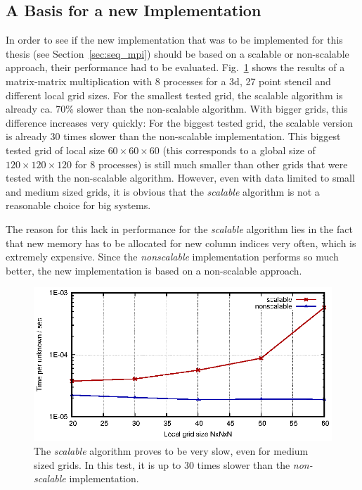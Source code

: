 \subsection{A Basis for a new Implementation}
In order to see if the new implementation that was to be implemented for this thesis (see Section~\ref{sec:seq_mpi}) should be based on a scalable or non-scalable approach, their performance had to be evaluated. Fig.~\ref{fig:scalable} shows the results of a matrix-matrix multiplication with 8 processes for a 3d, 27 point stencil and different local grid sizes. For the smallest tested grid, the scalable algorithm is already ca. 70\% slower than the non-scalable algorithm. With bigger grids, this difference increases very quickly: For the biggest tested grid, the scalable version is already 30 times slower than the non-scalable implementation. This biggest tested grid of local size $60 \times 60 \times 60$ (this corresponds to a global size of $120\times 120 \times 120$ for 8 processes) is still much smaller than other grids that were tested with the non-scalable algorithm. However, even with data limited to small and medium sized grids, it is obvious that the \textit{scalable} algorithm is not a reasonable choice for big systems. 

The reason for this lack in performance for the \textit{scalable} algorithm lies in the fact that new memory has to be allocated for new column indices very often, which is extremely expensive. Since the \textit{nonscalable} implementation performs so much better, the new implementation is based on a non-scalable approach. 

\begin{figure}[tbp]
	\centering
	\includegraphics[width=1\textwidth]{scalable}
	\caption{The \textit{scalable} algorithm proves to be very slow, even for medium sized grids. In this test, it is up to 30 times slower than the \textit{non-scalable} implementation.} 
	\label{fig:scalable}
\end{figure}

